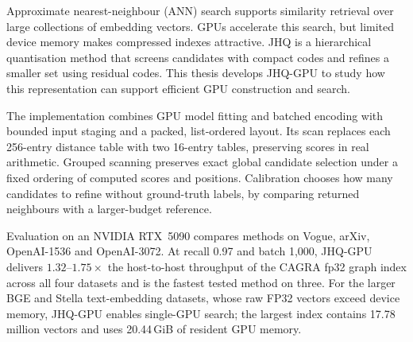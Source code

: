 Approximate nearest-neighbour (ANN) search supports similarity retrieval
over large collections of embedding vectors. GPUs accelerate this search,
but limited device memory makes compressed indexes attractive. JHQ is a
hierarchical quantisation method that screens candidates with compact
codes and refines a smaller set using residual codes. This thesis develops
JHQ-GPU to study how this representation can support efficient GPU
construction and search.

The implementation combines GPU model fitting and batched encoding with
bounded input staging and a packed, list-ordered layout. Its scan replaces
each 256-entry distance table with two 16-entry tables, preserving scores
in real arithmetic. Grouped scanning preserves exact global candidate
selection under a fixed ordering of computed scores and positions. Calibration chooses how
many candidates to refine without ground-truth labels, by comparing
returned neighbours with a larger-budget reference.

Evaluation on an NVIDIA RTX~5090 compares methods on Vogue, arXiv,
OpenAI-1536 and OpenAI-3072. At recall 0.97 and batch 1,000, JHQ-GPU
delivers $1.32$--$1.75\times$ the host-to-host throughput of the CAGRA fp32 graph index
across all four datasets and is the fastest tested method on three.
For the larger BGE and Stella text-embedding datasets, whose raw FP32 vectors exceed
device memory, JHQ-GPU enables single-GPU search; the largest index
contains 17.78 million vectors and uses 20.44\,GiB of resident GPU memory.
